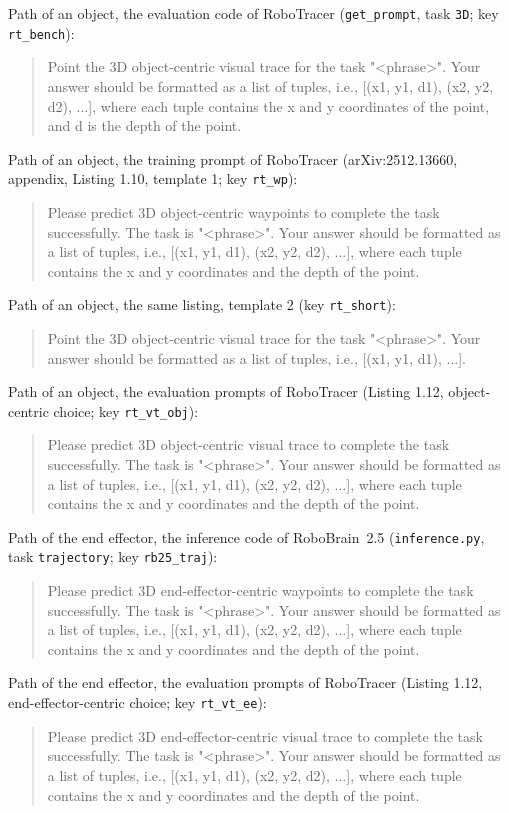 Path of an object, the evaluation code of RoboTracer (\texttt{get\_prompt}, task \texttt{3D}; key \texttt{rt\_bench}):
\begin{quote}\small\ttfamily\raggedright
Point the 3D object-centric visual trace for the task "<phrase>". Your answer should be formatted as a list of tuples, i.e., [(x1, y1, d1), (x2, y2, d2), ...], where each tuple contains the x and y coordinates of the point, and d is the depth of the point.
\end{quote}
Path of an object, the training prompt of RoboTracer (arXiv:2512.13660, appendix, Listing 1.10, template 1; key \texttt{rt\_wp}):
\begin{quote}\small\ttfamily\raggedright
Please predict 3D object-centric waypoints to complete the task successfully. The task is "<phrase>". Your answer should be formatted as a list of tuples, i.e., [(x1, y1, d1), (x2, y2, d2), ...], where each tuple contains the x and y coordinates and the depth of the point.
\end{quote}
Path of an object, the same listing, template 2 (key \texttt{rt\_short}):
\begin{quote}\small\ttfamily\raggedright
Point the 3D object-centric visual trace for the task "<phrase>". Your answer should be formatted as a list of tuples, i.e., [(x1, y1, d1), ...].
\end{quote}
Path of an object, the evaluation prompts of RoboTracer (Listing 1.12, object-centric choice; key \texttt{rt\_vt\_obj}):
\begin{quote}\small\ttfamily\raggedright
Please predict 3D object-centric visual trace to complete the task successfully. The task is "<phrase>". Your answer should be formatted as a list of tuples, i.e., [(x1, y1, d1), (x2, y2, d2), ...], where each tuple contains the x and y coordinates and the depth of the point.
\end{quote}
Path of the end effector, the inference code of RoboBrain~2.5 (\texttt{inference.py}, task \texttt{trajectory}; key \texttt{rb25\_traj}):
\begin{quote}\small\ttfamily\raggedright
Please predict 3D end-effector-centric waypoints to complete the task successfully. The task is "<phrase>". Your answer should be formatted as a list of tuples, i.e., [(x1, y1, d1), (x2, y2, d2), ...], where each tuple contains the x and y coordinates and the depth of the point.
\end{quote}
Path of the end effector, the evaluation prompts of RoboTracer (Listing 1.12, end-effector-centric choice; key \texttt{rt\_vt\_ee}):
\begin{quote}\small\ttfamily\raggedright
Please predict 3D end-effector-centric visual trace to complete the task successfully. The task is "<phrase>". Your answer should be formatted as a list of tuples, i.e., [(x1, y1, d1), (x2, y2, d2), ...], where each tuple contains the x and y coordinates and the depth of the point.
\end{quote}

